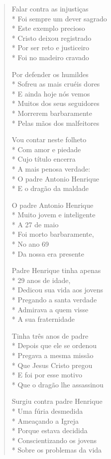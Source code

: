 \begin{verse}
Falar contra as injustiças\\*
Foi sempre um dever sagrado\\*
Este exemplo precioso\\*
Cristo deixou registrado\\*
Por ser reto e justiceiro\\*
Foi no madeiro cravado

Por defender os humildes\\*
Sofreu as mais cruéis dores\\*
E ainda hoje nós vemos\\*
Muitos dos seus seguidores\\*
Morrerem barbaramente\\*
Pelas mãos dos malfeitores

Vou contar neste folheto\\*
Com amor e piedade\\*
Cujo título encerra\\*
A mais penosa verdade:\\*
O padre Antonio Henrique\\*
E o dragão da maldade

O padre Antonio Henrique\\*
Muito jovem e inteligente\\*
A 27 de maio\\*
Foi morto barbaramente,\\*
No ano 69\\*
Da nossa era presente

Padre Henrique tinha apenas\\*
29 anos de idade,\\*
Dedicou sua vida aos jovens\\*
Pregando a santa verdade\\*
Admirava a quem visse\\*
A sua fraternidade

Tinha três anos de padre\\*
Depois que ele se ordenou\\*
Pregava a mesma missão\\*
Que Jesus Cristo pregou\\*
E foi por esse motivo\\*
Que o dragão lhe assassinou

Surgiu contra padre Henrique\\*
Uma fúria desmedida\\*
Ameaçando a Igreja\\*
Porque estava decidida\\*
Conscientizando os jovens\\*
Sobre os problemas da vida


\end{verse}
